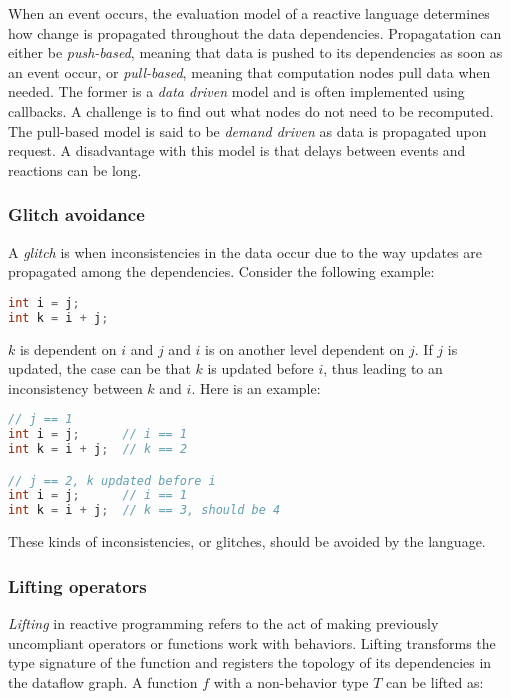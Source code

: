 When an event occurs, the evaluation model of a reactive language determines
how change is propagated throughout the data dependencies. Propagatation can
either be \textit{push-based}, meaning that data is pushed to its dependencies
as soon as an event occur, or \textit{pull-based}, meaning that computation
nodes pull data when needed. The former is a \textit{data driven} model and is
often implemented using callbacks. A challenge is to find out what nodes do not
need to be recomputed. The pull-based model is said to be \textit{demand
driven} as data is propagated upon request. A disadvantage with this model is
that delays between events and reactions can be long.

\subsubsection{Glitch avoidance}

A \textit{glitch} is when inconsistencies in the data occur due to the way
updates are propagated among the dependencies. Consider the following example:

\begin{lstlisting}[language=C]
int i = j;
int k = i + j;
\end{lstlisting}

$k$ is dependent on $i$ and $j$ and $i$ is on another level dependent on
$j$. If $j$ is updated, the case can be that $k$ is updated before $i$, thus
leading to an inconsistency between $k$ and $i$. Here is an example:


\begin{lstlisting}[language=C]
// j == 1
int i = j;      // i == 1
int k = i + j;  // k == 2

// j == 2, k updated before i
int i = j;      // i == 1
int k = i + j;  // k == 3, should be 4
\end{lstlisting}

These kinds of inconsistencies, or glitches, should be avoided by the language.

\subsubsection{Lifting operators}

\textit{Lifting} in reactive programming refers to the act of making previously
uncompliant operators or functions work with behaviors. Lifting transforms the
type signature of the function and registers the topology of its dependencies
in the dataflow graph. A function $f$ with a non-behavior type $T$ can be
lifted as:

